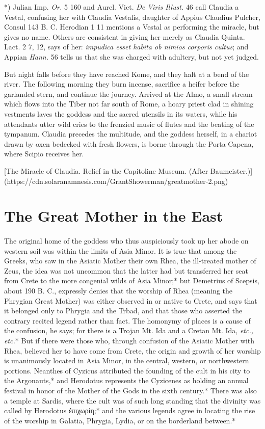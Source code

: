 \documentclass[a4paper, 11pt, oneside, polutonikogreek, english]{article}
\begin{document}
*) Julian Imp. \emph{Or.} 5 160 and Aurel. Vict. \emph{De Viris Illust.} 46 call Claudia a Vestal, confusing her with Claudia Vestalis, daughter of Appius Claudius Pulcher, Consul 143 B. C. Herodian 1 11 mentions a Vestal as performing the miracle, but gives no name. Others are consistent in giving her merely as Claudia Quinta. Lact. 2 7, 12, says of her: \emph{impudica esset habita ob nimios corporis cultus}; and Appian \emph{Hann.} 56 tells us that she was charged with adultery, but not yet judged.

But night falls before they have reached Kome, and they halt at a bend of the river. The following morning they burn incense, sacrifice a heifer before the garlanded stern, and continue the journey. Arrived at the Almo, a small stream which flows into the Tiber not far south of Rome, a hoary priest clad in shining vestments laves the goddess and the sacred utensils in its waters, while his attendants utter wild cries to the frenzied music of flutes and the beating of the tympanum. Claudia precedes the multitude, and the goddess herself, in a chariot drawn by oxen bedecked with fresh flowers, is borne through the Porta Capena, where Scipio receives her.

[The Miracle of Claudia. Relief in the Capitoline Museum. (After Baumeister.)](https://cdn.solaranamnesis.com/GrantShowerman/greatmother-2.png)

\section{The Great Mother in the East}
\paragraph{}
The original home of the goddess who thus auspiciously took up her abode on western soil was within the limits of Asia Minor. It is true that among the Greeks, who saw in the Asiatic Mother their own Rhea, the ill-treated mother of Zeus, the idea was not uncommon that the latter had but transferred her seat from Crete to the more congenial wilds of Asia Minor;* but Demetrius of Scepsis, about 190 B. C., expressly denies that the worship of Rhea (meaning the Phrygian Great Mother) was either observed in or native to Crete, and says that it belonged only to Phrygia and the Trbad, and that those who asserted the contrary recited legend rather than fact. The homonymy of places is a cause of the confusion, he says; for there is a Trojan Mt. Ida and a Cretan Mt. Ida, \emph{etc., etc.}* But if there were those who, through confusion of the Asiatic Mother with Rhea, believed her to have come from Crete, the origin and growth of her worship is unanimously located in Asia Minor, in the central, western, or northwestern portions. Neanthes of Cyzicus attributed the founding of the cult in his city to the Argonauts,* and Herodotus represents the Cyzicenes as holding an annual festival in honor of the Mother of the Gods in the sixth century.* There was also a temple at Sardis, where the cult was of such long standing that the divinity was called by Herodotus ἐπιχωρίη;* and the various legends agree in locating the rise of the worship in Galatia, Phrygia, Lydia, or on the borderland between.*
\end{document}
